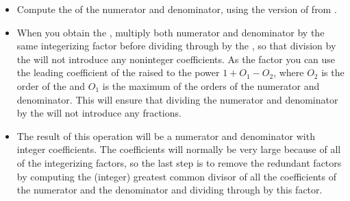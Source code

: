 \begin{itemize}

\item
Compute the  of the numerator and denominator, using the version
of  from .

\item
When you obtain the , multiply both numerator and denominator by
the same integerizing factor before dividing through by the , so
that division by the  will not introduce any noninteger
coefficients.  As the factor you can use the leading coefficient of the
 raised to the power \( 1 + O_1 - O_2 \), where \( O_2 \) is the
order of the  and \( O_1 \) is the maximum of the orders of the
numerator and denominator.  This will ensure that dividing the numerator and
denominator by the  will not introduce any fractions.

\item
The result of this operation will be a numerator and denominator with integer
coefficients.  The coefficients will normally be very large because of all of
the integerizing factors, so the last step is to remove the redundant factors
by computing the (integer) greatest common divisor of all the coefficients of
the numerator and the denominator and dividing through by this factor.

\end{itemize}

